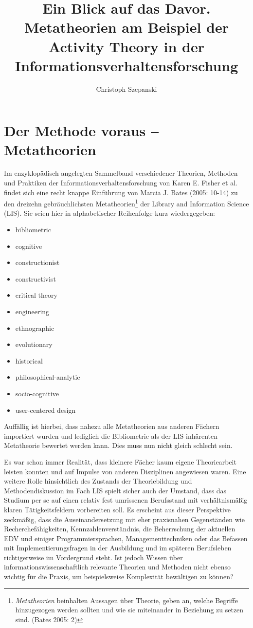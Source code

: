 \documentclass[a4paper,
fontsize=11pt,
oneside,
numbers=noperiodatend,
parskip=half-,
bibliography=totoc,
final
]{scrartcl}
\title{\LARGE{Ein Blick auf das Davor. Metatheorien am Beispiel der Activity Theory in der Informationsverhaltensforschung}} %
\author{Christoph Szepanski} %
\date{}
\begin{document}
\maketitle
\thispagestyle{fancyplain} 


\section*{Der Methode voraus --
Metatheorien}\label{der-methode-voraus-metatheorien}

Im enzyklopädisch angelegten Sammelband verschiedener Theorien, Methoden
und Praktiken der Informationsverhaltensforschung von Karen E. Fisher et
al. findet sich eine recht knappe Einführung von Marcia J. Bates (2005:
10-14) zu den dreizehn gebräuchlichsten Metatheorien\footnote{\emph{Metatheorien}
  beinhalten Aussagen über Theorie, geben an, welche Begriffe
  hinzugezogen werden sollten und wie sie miteinander in Beziehung zu
  setzen sind. (Bates 2005: 2)} der Library and Information Science
(LIS). Sie seien hier in alphabetischer Reihenfolge kurz wiedergegeben:

\begin{itemize}
\itemsep1pt\parskip0pt
\item
  bibliometric
\item
  cognitive
\item
  constructionist
\item
  constructivist
\item
  critical theory
\item
  engineering
\item
  ethnographic
\item
  evolutionary
\item
  historical
\item
  philosophical-analytic
\item
  socio-cognitive
\item
  user-centered design
\end{itemize}

Auffällig ist hierbei, dass nahezu alle Metatheorien aus anderen Fächern
importiert wurden und lediglich die Bibliometrie als der LIS inhärenten
Metatheorie bewertet werden kann. Dies muss nun nicht gleich schlecht
sein.

Es war schon immer Realität, dass kleinere Fächer kaum eigene
Theoriearbeit leisten konnten und auf Impulse von anderen Disziplinen
angewiesen waren. Eine weitere Rolle hinsichtlich des Zustands der
Theoriebildung und Methodendiskussion im Fach LIS spielt sicher auch der
Umstand, dass das Studium per se auf einen relativ fest umrissenen
Berufsstand mit verhältnismäßig klaren Tätigkeitsfeldern vorbereiten
soll. Es erscheint aus dieser Perspektive zeckmäßig, dass die
Auseinandersetzung mit eher praxisnahen Gegenständen wie
Recherchefähigkeiten, Kennzahlenverständnis, die Beherrschung der
aktuellen EDV und einiger Programmiersprachen, Managementtechniken oder
das Befassen mit Implementierungsfragen in der Ausbildung und im
späteren Berufsleben richtigerweise im Vordergrund steht. Ist jedoch
Wissen über informationswissenschaftlich relevante Theorien und Methoden
nicht ebenso wichtig für die Praxis, um beispielsweise Komplexität
bewältigen zu können?
\end{document}
